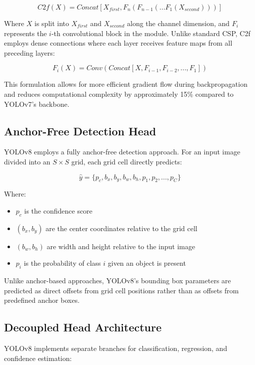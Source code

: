 \documentclass[11pt]{article}
\begin{document}
\begin{equation}
C2f(X) = Concat[X_{first}, F_n(F_{n-1}(...F_1(X_{second})))]
\end{equation}

Where $X$ is split into $X_{first}$ and $X_{second}$ along the channel dimension, and $F_i$ represents the $i$-th convolutional block in the module. Unlike standard CSP, C2f employs dense connections where each layer receives feature maps from all preceding layers:

\begin{equation}
F_i(X) = Conv(Concat[X, F_{i-1}, F_{i-2}, ..., F_1])
\end{equation}

This formulation allows for more efficient gradient flow during backpropagation and reduces computational complexity by approximately 15\% compared to YOLOv7's backbone.

\subsection{Anchor-Free Detection Head}
YOLOv8 employs a fully anchor-free detection approach. For an input image divided into an $S \times S$ grid, each grid cell directly predicts:

\begin{equation}
\hat{y} = \{p_c, b_x, b_y, b_w, b_h, p_1, p_2, ..., p_C\}
\end{equation}

Where:
\begin{itemize}
\item $p_c$ is the confidence score
\item $(b_x, b_y)$ are the center coordinates relative to the grid cell
\item $(b_w, b_h)$ are width and height relative to the input image
\item $p_i$ is the probability of class $i$ given an object is present
\end{itemize}

Unlike anchor-based approaches, YOLOv8's bounding box parameters are predicted as direct offsets from grid cell positions rather than as offsets from predefined anchor boxes.

\subsection{Decoupled Head Architecture}
YOLOv8 implements separate branches for classification, regression, and confidence estimation:
\end{document}
